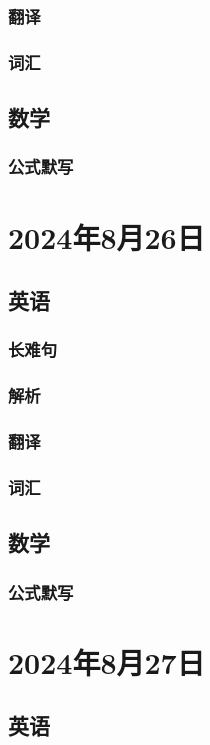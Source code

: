 \documentclass[UTF8]{ctexart}
\begin{document}
\subsubsection{翻译}
\subsubsection{词汇}
\subsection{数学}
\subsubsection{公式默写}
\begin{multicols}{2}
\end{multicols}
\section{2024年8月26日}
\subsection{英语}
\subsubsection{长难句}
\subsubsection{解析}
\subsubsection{翻译}
\subsubsection{词汇}
\subsection{数学}
\subsubsection{公式默写}
\begin{multicols}{2}
\end{multicols}
\section{2024年8月27日}
\subsection{英语}
\end{document}
